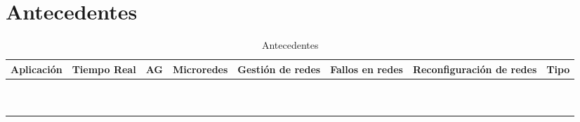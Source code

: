 
\section{Antecedentes}	
\begin{landscape} 
\centering

\begin{center}
\begin{longtable}{|p{2.5cm}|p{2cm}|p{1.6cm}|p{1.6cm}|p{2cm}|p{1.1cm}|p{3.4cm}|p{1.5cm}|}
	\caption{Antecedentes} \\
	\hline
	\cellcolor[gray]{0.9} \textbf{Aplicación} & \cellcolor[gray]{0.9}\textbf{Tiempo Real} & \cellcolor[gray]{0.9}\textbf{AG} & \cellcolor[gray]{0.9}\textbf{Microredes} & \cellcolor[gray]{0.9}\textbf{Gestión de redes} & \cellcolor[gray]{0.9}\textbf{Fallos en redes} &  \cellcolor[gray]{0.9}\textbf{Reconfiguración de redes} & \cellcolor[gray]{0.9}\textbf{Tipo}\\
	\hline
	  &  &  & &  & & &   \\
	\hline
	  &  &  & &  & & &  \\
	\hline
	  & &   & &  & & &   \\
	\hline
	 & &   & &  & & &   \\
	\hline
	 & &   & &  & & &   \\
	\hline
	 & &   & &  & & &   \\
	\hline
	 & &   & &  & & &   \\
	\hline
	 & &   & &  & & &   \\
	\hline
	 & &   & &  & & &   \\
	\hline
	 & &   & &  & & &   \\
	\hline
\end{longtable}	
\end{center}
\end{landscape}